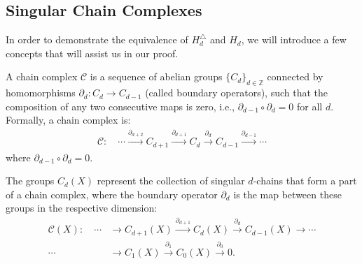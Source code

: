 \subsection{Singular Chain Complexes}
\label{SingularChainComplexes}
In order to demonstrate the equivalence of \( H_{d}^{\triangle} \) and \( H_{d} \), we will introduce a few concepts that will assist us in our proof.

\begin{definition}
	\label{ChainComplex}
	A chain complex $\mathcal{C}$ is a sequence of abelian groups \(\{C_d\}_{d \in \mathbb{Z}}\) connected by homomorphisms \(\partial_d: C_d \to C_{d-1}\) (called boundary operators), such that the composition of any two consecutive maps is zero, i.e., \(\partial_{d-1} \circ \partial_d = 0\) for all \(d\). Formally, a chain complex is:
	\begin{align}
		\mathcal{C}: \quad\cdots \xrightarrow{\partial_{d+2}} C_{d+1} \xrightarrow{\partial_{d+1}} C_d \xrightarrow{\partial_d} C_{d-1} \xrightarrow{\partial_{d-1}} \cdots 
	\end{align}
	where \(\partial_{d-1} \circ \partial_d = 0\).
\end{definition}

\begin{example}
	The groups $C_{d}(X)$ represent the collection of singular $d$-chains that form
	a part of a chain complex, where the boundary operator $\partial_{d}$ is the map between these groups in the respective dimension:
	\begin{align}
		\mathcal{C}(X):\quad \cdots &\xrightarrow{}C_{d+1}(X) \xrightarrow{\partial_{d+1}} C_{d}(X) \xrightarrow{\partial_d}C_{d-1}(X) \xrightarrow{}\cdots \nonumber\\
		\cdots &\xrightarrow{}C_{1}(X) \xrightarrow{\partial_1} C_{0}(X) \xrightarrow{\partial_0}0.                              
	\end{align}
\end{example}

